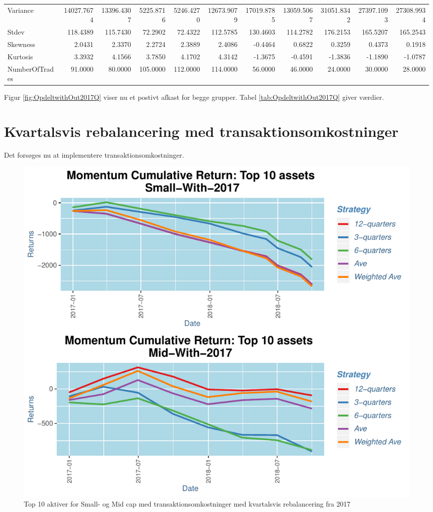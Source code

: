 \documentclass[]{article}
\begin{document}
\begin{table}
{\begin{tabular}[t]{lrrrrrrrrrr}
Variance & 14027.7674 & 13396.4307 & 5225.8716 & 5246.4270 & 12673.9079 & 17019.8785 & 13059.5067 & 31051.8342 & 27397.1093 & 27308.9934\\
Stdev & 118.4389 & 115.7430 & 72.2902 & 72.4322 & 112.5785 & 130.4603 & 114.2782 & 176.2153 & 165.5207 & 165.2543\\
Skewness & 2.0431 & 2.3370 & 2.2724 & 2.3889 & 2.4086 & -0.4464 & 0.6822 & 0.3259 & 0.4373 & 0.1918\\
\addlinespace
Kurtosis & 3.3932 & 4.1566 & 3.7850 & 4.1702 & 4.3142 & -1.3675 & -0.4591 & -1.3836 & -1.1890 & -1.0787\\
NumberOfTrades & 91.0000 & 80.0000 & 105.0000 & 112.0000 & 114.0000 & 56.0000 & 46.0000 & 24.0000 & 30.0000 & 28.0000\\
\bottomrule
\end{tabular}}
\end{table}

Figur \ref{fig:OpdeltwithOut2017Q} viser nu et postivt afkast for begge
grupper. Tabel \ref{tab:OpdeltwithOut2017Q} giver værdier.

\hypertarget{kvartalsvis-rebalancering-med-transaktionsomkostninger}{%
\section{Kvartalsvis rebalancering med
transaktionsomkostninger}\label{kvartalsvis-rebalancering-med-transaktionsomkostninger}}

Det forsøges nu at implementere transaktionsomkostninger.

\begin{figure}
\centering
\includegraphics{IPA_Small_and_Mid_files/figure-latex/fig5-1.pdf}
\caption{\label{fig:Opdelt2017Q}Top 10 aktiver for Small- og Mid cap med
transaktionsomkostninger med kvartalsvis rebalancering fra 2017}
\end{figure}
\end{document}
